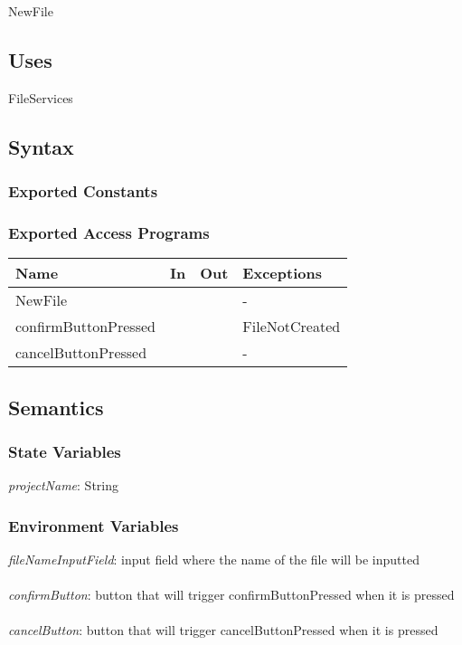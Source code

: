 \documentclass[12pt, titlepage]{article}
\begin{document}
	NewFile
	
	\subsection{Uses}
	FileServices
	
	\subsection{Syntax}
	
	\subsubsection{Exported Constants}
	
	\subsubsection{Exported Access Programs}
	
	\begin{center}
		\begin{tabular}{p{2cm} p{4cm} p{4cm} p{2cm}}
			\hline
			\textbf{Name} & \textbf{In} & \textbf{Out} & \textbf{Exceptions} \\
			\hline
			NewFile &  &  & - \\
			\hline
			confirmButtonPressed &  &  & FileNotCreated \\
			\hline
			cancelButtonPressed &  &  & - \\
			\hline
		\end{tabular}
	\end{center}
	
	\subsection{Semantics}
	
	\subsubsection{State Variables}
	\textit{projectName}: String
	
	
	\subsubsection{Environment Variables}
	
	\textit{fileNameInputField}: input field where the name of the file will be inputted \\\\
	\textit{confirmButton}: button that will trigger confirmButtonPressed when it is pressed \\\\ 
	\textit{cancelButton}: button that will trigger cancelButtonPressed when it is pressed \\\\ 
	
\end{document}
